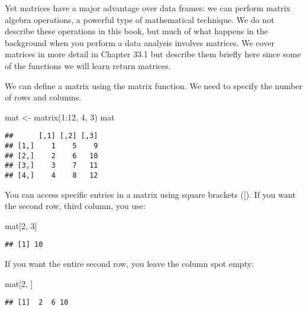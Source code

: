 \documentclass[
]{article}
\newenvironment{Shaded}{\begin{snugshade}}{\end{snugshade}}
\newcommand{\DecValTok}[1]{\textcolor[rgb]{0.00,0.00,0.81}{#1}}
\newcommand{\FunctionTok}[1]{\textcolor[rgb]{0.00,0.00,0.00}{#1}}
\newcommand{\NormalTok}[1]{#1}
\newcommand{\OtherTok}[1]{\textcolor[rgb]{0.56,0.35,0.01}{#1}}
\newcommand{\SpecialCharTok}[1]{\textcolor[rgb]{0.00,0.00,0.00}{#1}}
\begin{document}
Yet matrices have a major advantage over data frames: we can perform
matrix algebra operations, a powerful type of mathematical technique. We
do not describe these operations in this book, but much of what happens
in the background when you perform a data analysis involves matrices. We
cover matrices in more detail in Chapter 33.1 but describe them briefly
here since some of the functions we will learn return matrices.

We can define a matrix using the matrix function. We need to specify the
number of rows and columns.

\begin{Shaded}
\begin{Highlighting}[]
\NormalTok{mat }\OtherTok{\textless{}{-}} \FunctionTok{matrix}\NormalTok{(}\DecValTok{1}\SpecialCharTok{:}\DecValTok{12}\NormalTok{, }\DecValTok{4}\NormalTok{, }\DecValTok{3}\NormalTok{)}
\NormalTok{mat}
\end{Highlighting}
\end{Shaded}

\begin{verbatim}
##      [,1] [,2] [,3]
## [1,]    1    5    9
## [2,]    2    6   10
## [3,]    3    7   11
## [4,]    4    8   12
\end{verbatim}

You can access specific entries in a matrix using square brackets ({[}).
If you want the second row, third column, you use:

\begin{Shaded}
\begin{Highlighting}[]
\NormalTok{mat[}\DecValTok{2}\NormalTok{, }\DecValTok{3}\NormalTok{]}
\end{Highlighting}
\end{Shaded}

\begin{verbatim}
## [1] 10
\end{verbatim}

If you want the entire second row, you leave the column spot empty:

\begin{Shaded}
\begin{Highlighting}[]
\NormalTok{mat[}\DecValTok{2}\NormalTok{, ]}
\end{Highlighting}
\end{Shaded}

\begin{verbatim}
## [1]  2  6 10
\end{verbatim}
\end{document}
